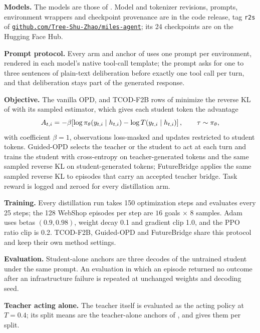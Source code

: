 \textbf{Models.} The models are those of . Model and tokenizer revisions, prompts, environment wrappers and checkpoint provenance are in the code release, tag \texttt{r2s} of \href{https://github.com/Tree-Shu-Zhao/miles-agent}{\nolinkurl{github.com/Tree-Shu-Zhao/miles-agent}}; its 24 checkpoints are on the Hugging Face Hub.

\textbf{Prompt protocol.} Every arm and anchor of  uses one prompt per environment, rendered in each model's native tool-call template; the prompt asks for one to three sentences of plain-text deliberation before exactly one tool call per turn, and that deliberation stays part of the generated response.

\textbf{Objective.} The vanilla OPD, \method{} and TCOD-F2B rows of  minimize the reverse KL of  with its sampled estimator, which gives each student token the advantage~\citep{mimo2026,li2026bestval}
\begin{equation}
\label{eq:opd-sampled}
A_{t,i}=-\beta\!\left[\log \pi_\theta(y_{t,i}\mid h_{t,i})-\log T(y_{t,i}\mid h_{t,i})\right],
\qquad \tau\sim\pi_\theta,
\end{equation}
with coefficient $\beta{=}1$, observations loss-masked and updates restricted to student tokens. Guided-OPD selects the teacher or the student to act at each turn and trains the student with cross-entropy on teacher-generated tokens and the same sampled reverse KL on student-generated tokens; FutureBridge applies the same sampled reverse KL to episodes that carry an accepted teacher bridge. Task reward is logged and zeroed for every distillation arm.

\textbf{Training.} Every distillation run takes 150 optimization steps and evaluates every 25 steps; the 128 WebShop episodes per step are $16$ goals $\times$ $8$ samples. Adam uses betas $(0.9, 0.98)$, weight decay 0.1 and gradient clip 1.0, and the PPO ratio clip is 0.2. TCOD-F2B, Guided-OPD and FutureBridge share this protocol and keep their own method settings.

\textbf{Evaluation.} Student-alone anchors are three decodes of the untrained student under the same prompt. An evaluation in which an episode returned no outcome after an infrastructure failure is repeated at unchanged weights and decoding seed.

\textbf{Teacher acting alone.} The teacher itself is evaluated as the acting policy at $T{=}0.4$; its split means are the teacher-alone anchors of , and  gives them per split.

